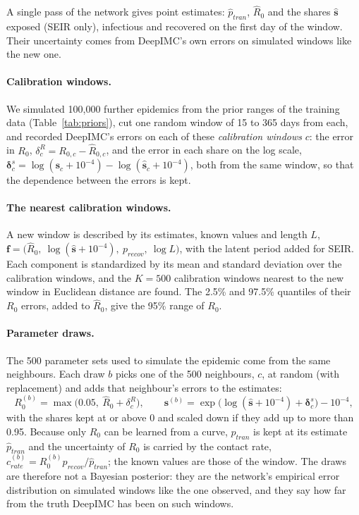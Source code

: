 \documentclass[12pt]{article}
\begin{document}
A single pass of the network gives point estimates: $\hat p_{tran}$, $\hat R_0$ and the shares $\hat{\bm s}$
exposed (SEIR only), infectious and recovered on the first day of the window. Their uncertainty comes from
DeepIMC's own errors on simulated windows like the new one.

\paragraph{Calibration windows.} We simulated 100,000 further epidemics from the prior ranges of the training data
(Table~\ref{tab:priors}), cut one random window of 15 to 365 days from each, and recorded DeepIMC's errors on each
of these \emph{calibration windows} $c$: the error in $R_0$, $\delta^{R}_c = R_{0,c} - \hat R_{0,c}$, and the error
in each share on the log scale, $\bm\delta^{s}_c = \log(\bm s_c + 10^{-4}) - \log(\hat{\bm s}_c + 10^{-4})$, both
from the same window, so that the dependence between the errors is kept.

\paragraph{The nearest calibration windows.} A new window is described by its estimates, known values and length
$L$, $\bm f = \big(\hat R_0,\ \log(\hat{\bm s} + 10^{-4}),\ p_{recov},\ \log L\big)$, with the latent period added
for SEIR. Each component is standardized by its mean and standard deviation over the calibration windows, and the
$K = 500$ calibration windows nearest to the new window in Euclidean distance are found. The 2.5\% and 97.5\%
quantiles of their $R_0$ errors, added to $\hat R_0$, give the 95\% range of $R_0$.

\paragraph{Parameter draws.} The 500 parameter sets used to simulate the epidemic come from the same neighbours.
Each draw $b$ picks one of the 500 neighbours, $c$, at random (with replacement) and adds that neighbour's errors to
the estimates:
\begin{equation}\label{eq:draws}
R_0^{(b)} = \max\big(0.05,\ \hat R_0 + \delta^{R}_c\big), \qquad
\bm s^{(b)} = \exp\big(\log(\hat{\bm s} + 10^{-4}) + \bm\delta^{s}_c\big) - 10^{-4},
\end{equation}
with the shares kept at or above 0 and scaled down if they add up to more than 0.95. Because only $R_0$ can be
learned from a curve, $p_{tran}$ is kept at its estimate $\hat p_{tran}$ and the uncertainty of $R_0$ is carried by
the contact rate, $c_{rate}^{(b)} = R_0^{(b)} p_{recov}/\hat p_{tran}$; the known values are those of the window.
The draws are therefore not a Bayesian posterior: they are the network's empirical error distribution on simulated
windows like the one observed, and they say how far from the truth DeepIMC has been on such windows.
\end{document}
